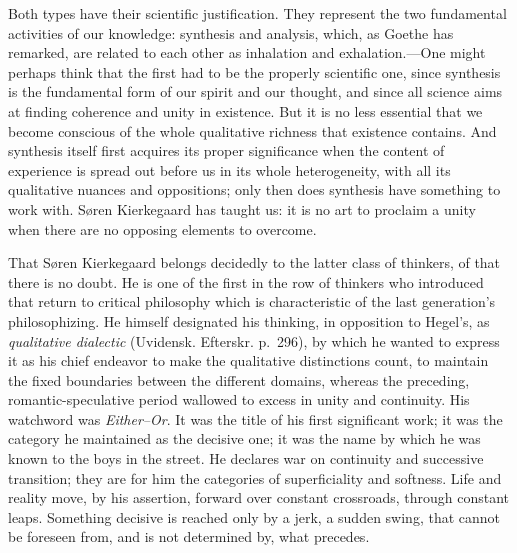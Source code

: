 \documentclass[12pt,a4paper]{book}
\newcommand{\opage}[1]{\marginnote{\footnotesize\textit{[#1]}}}
\begin{document}
Both types have their scientific justification. They represent the two
fundamental activities of our knowledge: synthesis and analysis, which, as
Goethe has remarked, are related to each other as inhalation and
exhalation.---One might perhaps think that the first had to be the
properly scientific one, since synthesis is the fundamental form of our
spirit and our thought, and since all science aims at finding coherence
and unity in existence. But it is no less essential that we become
conscious of the whole qualitative richness that existence contains. And
synthesis itself first acquires its proper significance when the content
of experience is spread out before us in its whole heterogeneity, with
all its qualitative nuances and oppositions; only then does synthesis
have something to work with. Søren Kierkegaard has taught us: it is no
\opage{72}art to proclaim a unity when there are no opposing elements to
overcome.

That Søren Kierkegaard belongs decidedly to the latter class of thinkers,
of that there is no doubt. He is one of the first in the row of thinkers
who introduced that return to critical philosophy which is characteristic
of the last generation's philosophizing. He himself designated his
thinking, in opposition to Hegel's, as \textit{qualitative dialectic}
(Uvidensk. Efterskr. p.~296), by which he wanted to express it as his
chief endeavor to make the qualitative distinctions count, to maintain the
fixed boundaries between the different domains, whereas the preceding,
romantic-speculative period wallowed to excess in unity and continuity.
His watchword was \textit{Either--Or}. It was the title of his first
significant work; it was the category he maintained as the decisive one;
it was the name by which he was known to the boys in the street. He
declares war on continuity and successive transition; they are for him
the categories of superficiality and softness. Life and reality move, by
his assertion, forward over constant crossroads, through constant leaps.
Something decisive is reached only by a jerk, a sudden swing, that cannot
be foreseen from, and is not determined by, what precedes.
\end{document}
